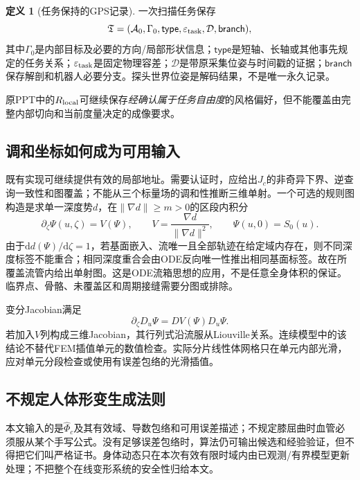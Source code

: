 \documentclass[UTF8,11pt,a4paper,fontset=fandol]{ctexart}
\numberwithin{equation}{section}
\theoremstyle{definition}
\newtheorem{definition}[theorem]{定义}
\newcommand{\dd}{\mathrm d}
\begin{document}
\begin{definition}[任务保持的GPS记录]
一次扫描任务保存
\begin{equation}
 \mathfrak T=(\mathcal A_0,\Gamma_0,\mathsf{type},\varepsilon_{\rm task},\mathcal D,\mathsf{branch}),
 \label{eq:record}
\end{equation}
其中$\Gamma_0$是内部目标及必要的方向/局部形状信息；$\mathsf{type}$是短轴、长轴或其他事先规定的任务关系；$\varepsilon_{\rm task}$是固定物理容差；$\mathcal D$是带原采集位姿与时间戳的证据；$\mathsf{branch}$保存解剖和机器人必要分支。探头世界位姿是解码结果，不是唯一永久记录。
\end{definition}
原PPT中的$R_{\rm local}$可继续保存\emph{经确认属于任务自由度}的风格偏好，但不能覆盖由完整内部切向和当前度量决定的成像要求。

\subsection{调和坐标如何成为可用输入}
既有实现可继续提供有效的局部地址。需要认证时，应给出$J_c$的非奇异下界、逆查询一致性和图覆盖；不能从三个标量场的调和性推断三维单射。一个可选的规则图构造是求单一深度势$d$，在$\|\nabla d\|\ge m>0$的区段内积分
\begin{equation}
 \partial_\zeta\Psi(u,\zeta)=V(\Psi),\qquad V=\frac{\nabla d}{\|\nabla d\|^2},\qquad \Psi(u,0)=S_0(u).
 \label{eq:flowchart}
\end{equation}
由于$\dd d(\Psi)/\dd\zeta=1$，若基面嵌入、流唯一且全部轨迹在给定域内存在，则不同深度标签不能重合；相同深度重合会由ODE反向唯一性推出相同基面标签。故在所覆盖流管内给出单射图。这是ODE流箱思想的应用，不是任意全身体积的保证。临界点、骨骼、未覆盖区和周期接缝需要分图或排除。

变分Jacobian满足
\begin{equation}
 \partial_\zeta D_u\Psi=DV(\Psi)D_u\Psi.
\end{equation}
若加入$V$列构成三维Jacobian，其行列式沿流服从Liouville关系。连续模型中的该结论不替代FEM插值单元的数值检查。实际分片线性体网格只在单元内部光滑，应对单元分段检查或使用有误差包络的光滑插值。

\subsection{不规定人体形变生成法则}
本文输入的是$\widehat\Phi_c$及其有效域、导数包络和可用误差描述；不规定膝屈曲时血管必须服从某个手写公式。没有足够误差包络时，算法仍可输出候选和经验验证，但不得把它们叫严格证书。身体动态只在本次有效有限时域内由已观测/有界模型更新处理；不把整个在线变形系统的安全性归给本文。
\end{document}
